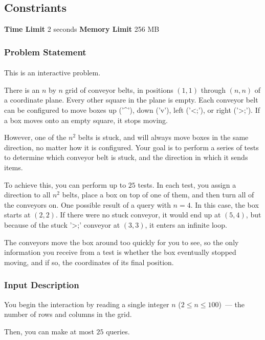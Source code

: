 \documentclass{article}
\begin{document}
\subsection*{Constriants}
\textbf{Time Limit}
2 seconds
\hfill
\textbf{Memory Limit}
256 MB
\subsubsection*{Problem Statement}
\paragraph{}This is an interactive problem.

There is an $n$ by $n$ grid of conveyor belts, in positions $(1, 1)$ through $(n, n)$ of a coordinate plane. Every other square in the plane is empty. Each conveyor belt can be configured to move boxes up ('^'), down ('v'), left ('<;'), or right ('>;'). If a box moves onto an empty square, it stops moving.

However, one of the $n^2$ belts is stuck, and will always move boxes in the same direction, no matter how it is configured. Your goal is to perform a series of tests to determine which conveyor belt is stuck, and the direction in which it sends items.

To achieve this, you can perform up to $25$ tests. In each test, you assign a direction to all $n^2$ belts, place a box on top of one of them, and then turn all of the conveyors on. One possible result of a query with $n=4$. In this case, the box starts at $(2, 2)$. If there were no stuck conveyor, it would end up at $(5, 4)$, but because of the stuck '>;' conveyor at $(3, 3)$, it enters an infinite loop.

The conveyors move the box around too quickly for you to see, so the only information you receive from a test is whether the box eventually stopped moving, and if so, the coordinates of its final position.
\paragraph{}
\subsubsection*{Input Description}You begin the interaction by reading a single integer $n$ ($2 \le n\le 100$) — the number of rows and columns in the grid.

Then, you can make at most $25$ queries.
\end{document}
